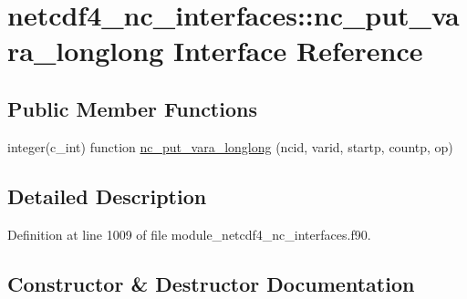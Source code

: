 \hypertarget{interfacenetcdf4__nc__interfaces_1_1nc__put__vara__longlong}{}\section{netcdf4\+\_\+nc\+\_\+interfaces\+:\+:nc\+\_\+put\+\_\+vara\+\_\+longlong Interface Reference}
\label{interfacenetcdf4__nc__interfaces_1_1nc__put__vara__longlong}
\subsection*{Public Member Functions}
\begin{DoxyCompactItemize}
\item 
integer(c\+\_\+int) function \hyperlink{interfacenetcdf4__nc__interfaces_1_1nc__put__vara__longlong_afab1423df641b0e3d7b4ae36a2f8c4de}{nc\+\_\+put\+\_\+vara\+\_\+longlong} (ncid, varid, startp, countp, op)
\end{DoxyCompactItemize}


\subsection{Detailed Description}


Definition at line 1009 of file module\+\_\+netcdf4\+\_\+nc\+\_\+interfaces.\+f90.



\subsection{Constructor \& Destructor Documentation}
\mbox{\label{interfacenetcdf4__nc__interfaces_1_1nc__put__vara__longlong_afab1423df641b0e3d7b4ae36a2f8c4de}} 
